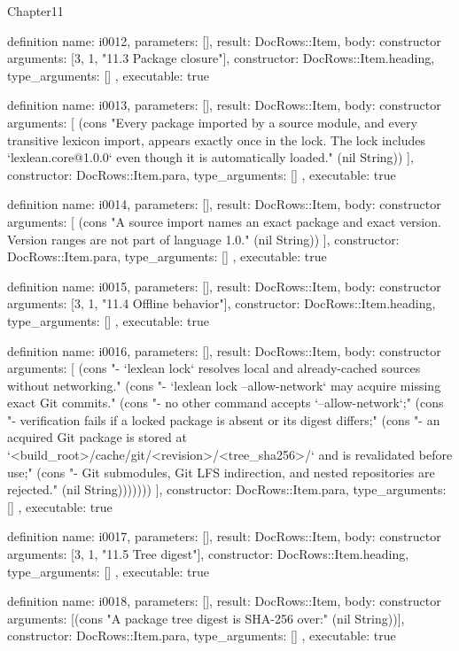 \begin{lexlean}{Chapter11}
\begin{semanticmodule}
definition{
  name: i0012,
  parameters: [],
  result: DocRows::Item,
  body: constructor{
    arguments: [3, 1, "11.3 Package closure"],
    constructor: DocRows::Item.heading,
    type_arguments: []
  },
  executable: true
}

definition{
  name: i0013,
  parameters: [],
  result: DocRows::Item,
  body: constructor{
    arguments: [
      (cons "Every package imported by a source module, and every transitive lexicon import, appears exactly once in the lock. The lock includes `lexlean.core@1.0.0` even though it is automatically loaded." (nil String))
    ],
    constructor: DocRows::Item.para,
    type_arguments: []
  },
  executable: true
}

definition{
  name: i0014,
  parameters: [],
  result: DocRows::Item,
  body: constructor{
    arguments: [
      (cons "A source import names an exact package and exact version. Version ranges are not part of language 1.0." (nil String))
    ],
    constructor: DocRows::Item.para,
    type_arguments: []
  },
  executable: true
}

definition{
  name: i0015,
  parameters: [],
  result: DocRows::Item,
  body: constructor{
    arguments: [3, 1, "11.4 Offline behavior"],
    constructor: DocRows::Item.heading,
    type_arguments: []
  },
  executable: true
}

definition{
  name: i0016,
  parameters: [],
  result: DocRows::Item,
  body: constructor{
    arguments: [
      (cons "- `lexlean lock` resolves local and already-cached sources without networking." (cons "- `lexlean lock --allow-network` may acquire missing exact Git commits." (cons "- no other command accepts `--allow-network`;" (cons "- verification fails if a locked package is absent or its digest differs;" (cons "- an acquired Git package is stored at `<build_root>/cache/git/<revision>/<tree_sha256>/` and is revalidated before use;" (cons "- Git submodules, Git LFS indirection, and nested repositories are rejected." (nil String)))))))
    ],
    constructor: DocRows::Item.para,
    type_arguments: []
  },
  executable: true
}

definition{
  name: i0017,
  parameters: [],
  result: DocRows::Item,
  body: constructor{
    arguments: [3, 1, "11.5 Tree digest"],
    constructor: DocRows::Item.heading,
    type_arguments: []
  },
  executable: true
}

definition{
  name: i0018,
  parameters: [],
  result: DocRows::Item,
  body: constructor{
    arguments: [(cons "A package tree digest is SHA-256 over:" (nil String))],
    constructor: DocRows::Item.para,
    type_arguments: []
  },
  executable: true
}


\end{semanticmodule}
\end{lexlean}

